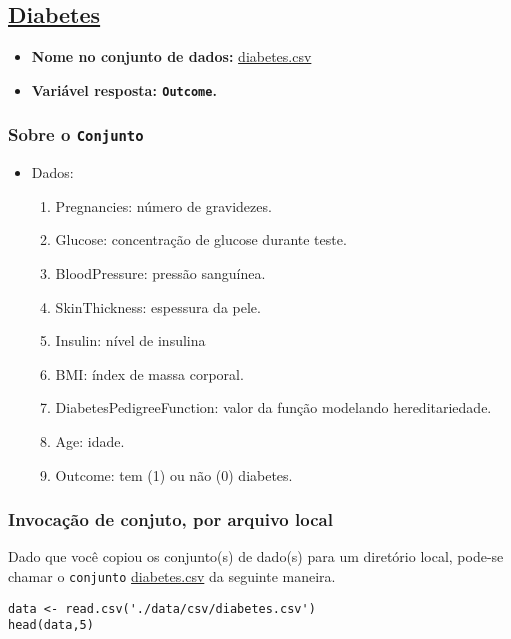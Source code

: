 \documentclass[12pt]{article}
\begin{document}
\subsection{\href{https://www.kaggle.com/uciml/pima-indians-diabetes-database}{Diabetes}}
\label{sec:orgc90c655}
\begin{itemize}
\item \textbf{Nome no conjunto de dados:} \href{https://drive.google.com/file/d/19eaULwopwE1hco\_R9QZIXqDuA3CS2OBh/view?usp=sharing}{diabetes.csv}
\item \textbf{Variável resposta:  \texttt{Outcome}.}
\end{itemize}
\subsubsection{Sobre o \texttt{Conjunto}}
\label{sec:org57088c6}
\begin{itemize}
\item Dados:
\begin{enumerate}
\item Pregnancies: número de gravidezes.
\item Glucose: concentração de glucose durante teste.
\item BloodPressure: pressão sanguínea.
\item SkinThickness: espessura da pele.
\item Insulin: nível de insulina
\item BMI: índex de massa corporal.
\item DiabetesPedigreeFunction: valor da função modelando hereditariedade.
\item Age: idade.
\item Outcome: tem (1) ou não (0) diabetes.
\end{enumerate}
\end{itemize}
\subsubsection{Invocação de conjuto, por arquivo local}
\label{sec:org036aff5}

Dado que você copiou os conjunto(s) de dado(s) para um diretório
local, pode-se chamar o \texttt{conjunto} \href{https://drive.google.com/file/d/19eaULwopwE1hco\_R9QZIXqDuA3CS2OBh/view?usp=sharing}{diabetes.csv} da seguinte maneira.

\begin{verbatim}
data <- read.csv('./data/csv/diabetes.csv')
head(data,5)
\end{verbatim}
\end{document}
